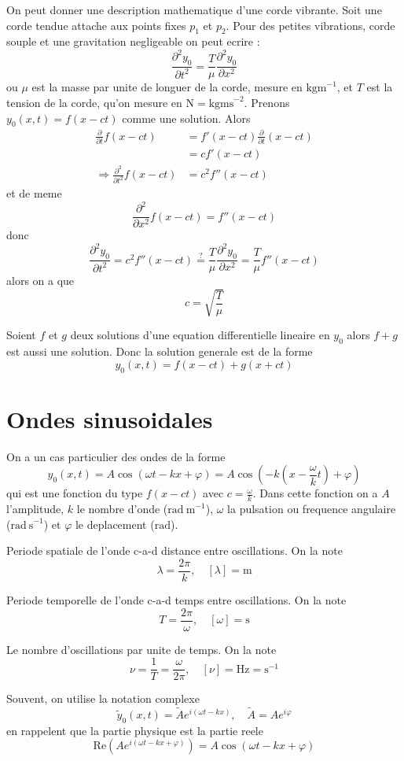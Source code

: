 On peut donner une description mathematique d'une corde vibrante. Soit une corde tendue attache aux points fixes $p_{1}$ et $p_{2}$. Pour des petites vibrations, corde souple et une gravitation negligeable on peut ecrire :
$$
\frac{ \partial^{2} y_{0} }{ \partial t^{2} } =\frac{T}{\mu} \frac{ \partial^{2}y_{0} }{ \partial x^{2} }
$$
ou $\mu$ est la masse par unite de longuer de la corde, mesure en $\mathrm{kgm}^{-1}$, et $T$ est la tension de la corde, qu'on mesure en $\mathrm{N}=\mathrm{kgms}^{-2}$. Prenons $y_{0}(x,t)=f(x-ct)$ comme une solution. Alors
\begin{align*}
\frac{ \partial  }{ \partial t } f(x-ct) & =f'(x-ct) \frac{ \partial  }{ \partial t } (x-ct) \\
 & =cf'(x-ct) \\
\Rightarrow \frac{ \partial^{2} }{ \partial t^{2} } f(x-ct) & =c^{2}f''(x-ct)
\end{align*}
et de meme
$$
\frac{ \partial^{2} }{ \partial x^{2} } f(x-ct)=f''(x-ct)
$$
donc
$$
\frac{ \partial^{2}y_{0} }{ \partial t^{2} } =c^{2}f''(x-ct)\overset{?}=\frac{T}{\mu}\frac{ \partial^{2}y_{0} }{ \partial x^{2} } =\frac{T}{\mu}f''(x-ct)
$$
alors on a que
$$
c=\sqrt{ \frac{T}{\mu} }
$$

Soient $f$ et $g$ deux solutions d'une equation differentielle lineaire en $y_{0}$ alors $f+g$ est aussi une solution. Donc la solution generale est de la forme
$$
y_{0}(x,t)=f(x-ct)+g(x+ct)
$$


\section{Ondes sinusoidales}

On a un cas particulier des ondes de la forme
$$
y_{0}(x,t)=A\cos (\omega t-kx+\varphi)=A\cos\left( -k\left( x-\frac{\omega}{k}t \right)+\varphi \right)
$$
qui est une fonction du type $f(x-ct)$ avec $c=\frac{\omega}{k}$. Dans cette fonction on a $A$ l'amplitude, $k$ le nombre d'onde ($\mathrm{rad~m}^{-1}$), $\omega$ la pulsation ou frequence angulaire ($\mathrm{rad~s}^{-1}$) et $\varphi$ le deplacement ($\mathrm{rad}$).
\begin{definition}
Periode spatiale de l'onde c-a-d distance entre oscillations. On la note
$$
\lambda=\frac{2\pi}{k},\quad[\lambda]=\mathrm{m}
$$
\end{definition}
\begin{definition}[Periode]
Periode temporelle de l'onde c-a-d temps entre oscillations. On la note
$$
T=\frac{2\pi}{\omega},\quad [\omega]=\mathrm{s}
$$
\end{definition}
\begin{definition}[Frequence]
Le nombre d'oscillations par unite de temps. On la note
$$
\nu=\frac{1}{T}=\frac{\omega}{2\pi},\quad [\nu]=\mathrm{Hz}=\mathrm{s}^{-1}
$$
\end{definition}
\begin{remark}
Souvent, on utilise la notation complexe
$$
\tilde{y}_{0}(x,t)=\tilde{A}e^{i(\omega t-kx)},\quad \tilde{A}=Ae^{i\varphi}
$$
en rappelent que la partie physique est la partie reele
$$
\mathrm{Re}(Ae^{i(\omega t-kx+\varphi)})=A\cos(\omega t-kx+\varphi)
$$
\end{remark}
